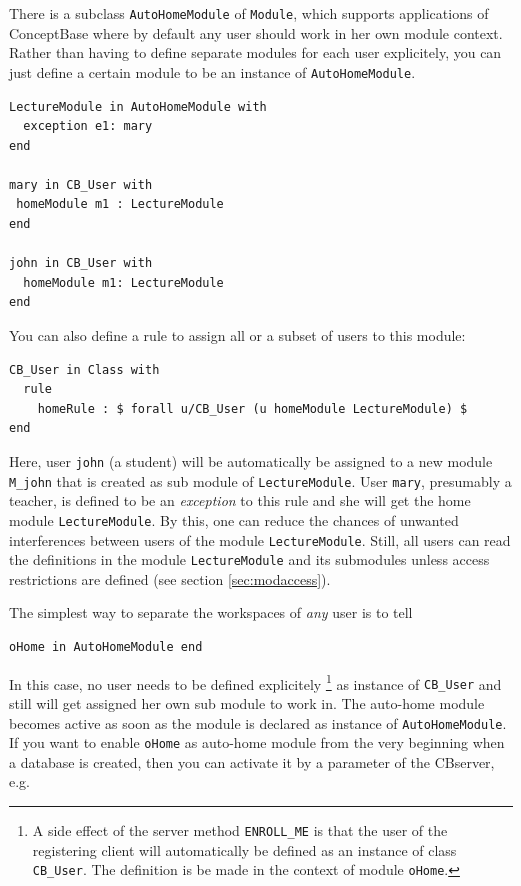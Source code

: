 There is a subclass {\tt AutoHomeModule} of {\tt Module}, which supports
applications of ConceptBase where by default any user should
work in her own module context. Rather than having to define separate
modules for each user explicitely, you can just define a certain module to be an instance
of {\tt AutoHomeModule}. 

\begin{verbatim}
LectureModule in AutoHomeModule with
  exception e1: mary
end

mary in CB_User with
 homeModule m1 : LectureModule
end

john in CB_User with
  homeModule m1: LectureModule
end
\end{verbatim}

You can also define a rule to assign all or a subset of users to this 
module:

\begin{verbatim}
CB_User in Class with  
  rule
    homeRule : $ forall u/CB_User (u homeModule LectureModule) $
end 
\end{verbatim}


Here, user {\tt john} (a student) will be automatically be assigned to a new module
{\tt M\_john} that is created as sub module of {\tt LectureModule}.
User {\tt mary}, presumably a teacher, is defined to be an {\em exception\/} to this
rule and she will get the home module {\tt LectureModule}.
By this, one can reduce the chances of unwanted interferences between users
of the module {\tt LectureModule}. Still, all users can read the
definitions in the module {\tt LectureModule} and its submodules unless
access restrictions are defined (see section \ref{sec:modaccess}).

The simplest way to separate the workspaces of {\em any\/} user
is to tell

\begin{verbatim}
oHome in AutoHomeModule end
\end{verbatim}

In this case, no user needs to be defined explicitely%
\footnote{A side effect of the server method {\tt ENROLL\_ME} is that the user
of the registering client will automatically be defined as an instance of class
{\tt CB\_User}. The definition is be made in the context of module
{\tt oHome}.}
 as instance of {\tt CB\_User} and still
will get assigned her own sub module to work in. 
The auto-home module becomes active as soon as the module is declared
as instance of {\tt AutoHomeModule}. If you want to enable {\tt oHome}
as auto-home module from the very beginning when a database is created,
then you can activate it by a parameter of the CBserver, e.g.


